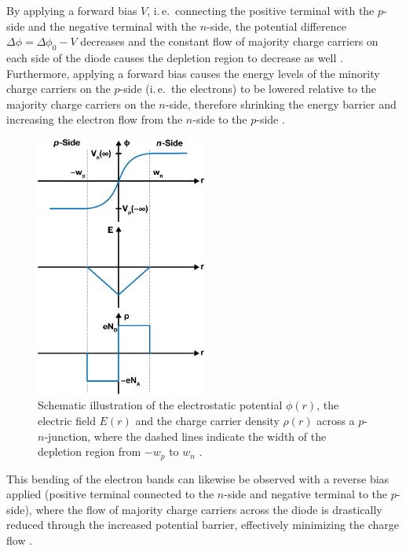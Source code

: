By applying a forward bias $V$, i.\,e.\ connecting the positive terminal with the $p$-side and the negative terminal with the $n$-side, the potential difference $\Delta \phi = \Delta \phi_0 - V$ decreases and the constant flow of majority charge carriers on each side of the diode causes the depletion region to decrease as well \cite{Hook1991,Piprek2003,Kittel2004}. Furthermore, applying a forward bias causes the energy levels of the minority charge carriers on the $p$-side (i.\,e.\ the electrons) to be lowered relative to the majority charge carriers on the $n$-side, therefore shrinking the energy barrier and increasing the electron flow from the $n$-side to the $p$-side \cite{Hook1991,Piprek2003,Kittel2004}.
\begin{figure}[H]
	\centering
	\includegraphics[width=0.5\textwidth]{Figures/Schematics/Theoretical Foundations/p-n-junction-potential-efield-charge-carrier-density.pdf}
	\caption{Schematic illustration of the electrostatic potential $\phi\left(r\right)$, the electric field $E\left(r\right)$ and the charge carrier density $\rho\left(r\right)$ across a $p$-$n$-junction, where the dashed lines indicate the width of the depletion region from $-w_p$ to $w_n$ \cite{Hook1991,Piprek2003,Kittel2004}.}
	\label{fig:p-n-junction-potential-efield-charge-carrier-density}
\end{figure}
This bending of the electron bands can likewise be observed with a reverse bias applied (positive terminal connected to the $n$-side and negative terminal to the $p$-side), where the flow of majority charge carriers across the diode is drastically reduced through the increased potential barrier, effectively minimizing the charge flow \cite{Hook1991,Piprek2003,Kittel2004}.

